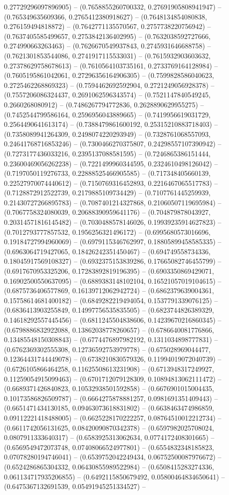 0.27729296097896905) -- (0.7658855260700332, 0.27691905808941947) -- (0.765349635609366, 0.2765412380918627) -- (0.7648134854080838, 0.276159494818872) -- (0.7642771135570567, 0.2757738220756942) -- (0.7637405585499657, 0.2753842136402995) -- (0.7632038592727666, 0.274990663263463) -- (0.7626670549937843, 0.2745931646688758) -- (0.7621301853544086, 0.2741917115533031) -- (0.7615932903603632, 0.27378629758678613) -- (0.7610564103735161, 0.2733769164128984) -- (0.7605195861042061, 0.27296356164906305) -- (0.7599828586040623, 0.2725462268869323) -- (0.7594462692592904, 0.2721249056928378) -- (0.7557206086324437, 0.2691062596343574) -- (0.7521147840549245, 0.2660268080912) -- (0.7486267794772836, 0.2628890629955275) -- (0.7452544799586164, 0.2596956043889665) -- (0.7419956619031729, 0.2564490641613174) -- (0.7388479861600192, 0.25315210883718403) -- (0.7358089941264309, 0.2498074220293949) -- (0.7328761068557093, 0.24641768716853246) -- (0.7300466270375807, 0.24298557107390942) -- (0.7273177436033216, 0.2395137088581595) -- (0.7246865386151444, 0.23600469056262238) -- (0.7221499960344595, 0.2324610498126042) -- (0.7197050119276733, 0.22888525466905585) -- (0.717348405660139, 0.22527970074440612) -- (0.7150769316452893, 0.2216467065517783) -- (0.7128872912522739, 0.2179885109734429) -- (0.7107761445259939, 0.21430727266895783) -- (0.7087401214327868, 0.21060507119695984) -- (0.7067758324080039, 0.20688390959641176) -- (0.704879878043927, 0.20314571816145482) -- (0.7030488578146026, 0.19939235914627823) -- (0.7012793777857532, 0.1956256321496172) -- (0.6995680573016696, 0.19184727994960069) -- (0.6979115346762997, 0.18805899458585335) -- (0.6963064719427065, 0.18426242351450467) -- (0.694749558734336, 0.18045917569108327) -- (0.6932375153839286, 0.17665082746455799) -- (0.6917670953325206, 0.17283892819196395) -- (0.6903350869429071, 0.16902500550637095) -- (0.6889383148102104, 0.16521057019104615) -- (0.6875736406577869, 0.16139712062942724) -- (0.6862379639004361, 0.15758614681400182) -- (0.6849282219494054, 0.1537791339076125) -- (0.6836413903255849, 0.14997756535835505) -- (0.6823744826389329, 0.14618292557445456) -- (0.6811245504838606, 0.14239670216860345) -- (0.6798886832922088, 0.13862038778260657) -- (0.6786640081776866, 0.13485548150308843) -- (0.6774476897982192, 0.1311034898777831) -- (0.6762369302555308, 0.12736592753979778) -- (0.675028969044477, 0.12364431744449078) -- (0.6738210830579326, 0.11994019072040739) -- (0.6726105866464258, 0.11625508613231908) -- (0.6713948317249927, 0.11259054915099463) -- (0.6701712079128309, 0.10894813062111472) -- (0.6689371426840823, 0.10532938501592858) -- (0.6676901015004435, 0.10173586826509787) -- (0.6664275878881257, 0.0981691351409443) -- (0.6651471434130185, 0.09463073618831802) -- (0.6638463474986859, 0.09112221418488005) -- (0.6625228170222257, 0.08764510012212734) -- (0.6611742056131625, 0.08420090870342378) -- (0.6597982025708024, 0.0807911333640317) -- (0.6583925313062634, 0.0774172408301665) -- (0.6569549472073748, 0.07408066524977801) -- (0.6554832348185823, 0.07078280194746041) -- (0.6539752042249434, 0.06752500087976672) -- (0.6524286865304332, 0.06430855989522984) -- (0.6508415283274336, 0.061134717935206855) -- (0.6492115850679492, 0.05800464834650641) -- (0.6475367132691539, 0.05491945251334527) -- 